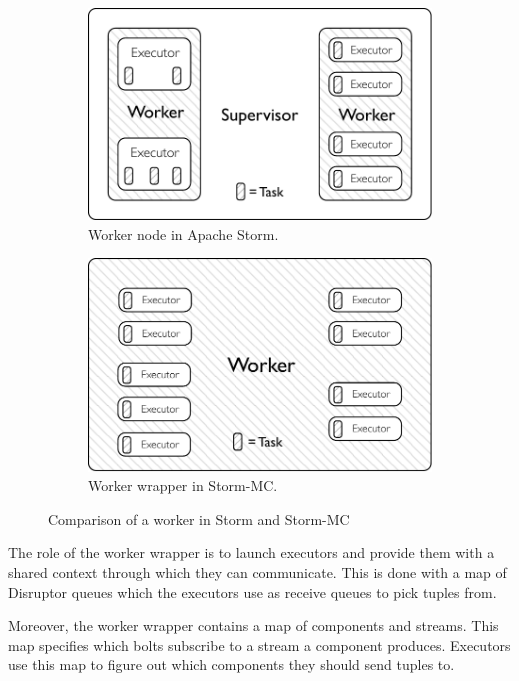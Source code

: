 \documentclass[bsc,twoside,singlespacing,normalheadings,parskip]{infthesis}\usepackage[]{graphicx}\usepackage[]{color}
\begin{document}
\begin{figure}[!htb]
\centering
\begin{subfigure}{.5\textwidth}
  \centering
  \includegraphics[width=0.95\linewidth]{pdf/distributed_worker.pdf}
  \caption{Worker node in Apache Storm.}
  \label{fig:comparison1}
\end{subfigure}\begin{subfigure}{.5\textwidth}
  \centering
  \includegraphics[width=0.95\linewidth]{pdf/local_worker.pdf}
  \caption{Worker wrapper in Storm-MC.}
  \label{fig:comparison2}
\end{subfigure}
\caption{Comparison of a worker in Storm and Storm-MC}
\label{fig:comparison}
\end{figure}

The role of the worker wrapper is to launch executors and provide them with a shared context through which they can communicate. This is done with a map of Disruptor queues which the executors use as receive queues to pick tuples from.

Moreover, the worker wrapper contains a map of components and streams. This map specifies which bolts subscribe to a stream a component produces. Executors use this map to figure out which components they should send tuples to.
\end{document}
